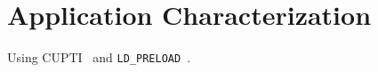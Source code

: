 \chapter{Application Characterization}

Using CUPTI~\cite{nvidia2017cupti} and \texttt{LD\_PRELOAD}~\cite{kerrisk2017ld}.